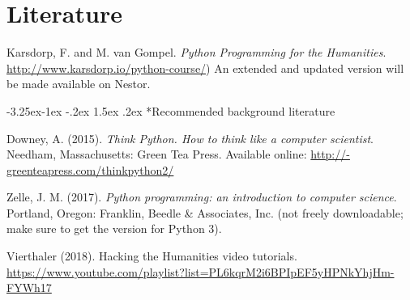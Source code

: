 \documentclass[a4paper,12pt]{article}
\makeatletter
\renewcommand\subsection{\@startsection{subsection}{2}{\z@}%
		{-3.25ex\@plus -1ex \@minus -.2ex}%
		{1.5ex \@plus .2ex}%
		{\normalfont\scshape}}
\makeatother
\begin{document}
\section{Literature}
Karsdorp, F. and M. van Gompel. \emph{Python Programming for the Humanities}.
\url{http://www.karsdorp.io/python-course/})
An extended and updated version will be made available on Nestor.


\subsection*{Recommended background literature}

Downey, A. (2015). \emph{Think Python. How to think like a computer scientist}.
Needham, Massachusetts: Green Tea Press.
Available online: \url{http://-greenteapress.com/thinkpython2/}

Zelle, J. M. (2017).
\emph{Python programming: an introduction to computer science}.
Portland, Oregon: Franklin, Beedle \& Associates, Inc.
(not freely downloadable; make sure to get the version for Python 3).

Vierthaler (2018). Hacking the Humanities video tutorials.
\url{https://www.youtube.com/playlist?list=PL6kqrM2i6BPIpEF5yHPNkYhjHm-FYWh17}


\pagebreak
\end{document}

